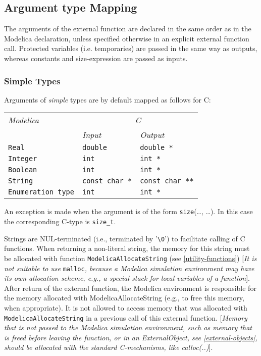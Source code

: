 \subsection{Argument type Mapping}

The arguments of the external function are declared in the same order as
in the Modelica declaration, unless specified otherwise in an explicit
external function call. Protected variables (i.e. temporaries) are
passed in the same way as outputs, whereas constants and size-expression
are passed as inputs.

\subsubsection{Simple Types}

Arguments of \emph{simple} types are by default mapped as follows for C:

\begin{longtable}[]{|l|l|l|}
\hline
\emph{Modelica} & \multicolumn{2}{c|}{\emph{C}}\\
& \emph{Input} & \emph{Output}\\ \hline
\endhead
\lstinline!Real! & \lstinline!double! & \lstinline!double *!\\ \hline
\lstinline!Integer! & \lstinline!int! & \lstinline!int *!\\ \hline
\lstinline!Boolean! & \lstinline!int! & \lstinline!int *!\\ \hline
\lstinline!String! & \lstinline!const char *! & \lstinline!const char **!\\ \hline
\lstinline!Enumeration type! & \lstinline!int! & \lstinline!int *!\\ \hline
\end{longtable}

An exception is made when the argument is of the form \lstinline!size!(\ldots{},
\ldots{}). In this case the corresponding C-type is \lstinline!size_t!.

Strings are NUL-terminated (i.e., terminated by '\lstinline!\0!') to
facilitate calling of C functions. When returning a non-literal string,
the memory for this string must be allocated with function
\lstinline!ModelicaAllocateString! (see \autoref{utility-functions}) {[}\emph{It is not suitable
to use} \lstinline!malloc!\emph{, because a Modelica simulation environment may have
its own allocation scheme, e.g., a special stack for local variables of
a function}{]}. After return of the external function, the Modelica
environment is responsible for the memory allocated with
ModelicaAllocateString (e.g., to free this memory, when appropriate). It
is not allowed to access memory that was allocated with
\lstinline!ModelicaAllocateString! in a previous call of this external function.
{[}\emph{Memory that is not passed to the Modelica simulation
environment, such as memory that is freed before leaving the function,
or in an ExternalObject, see \autoref{external-objects}, should be allocated
with the standard C-mechanisms, like calloc(..)}{]}.

